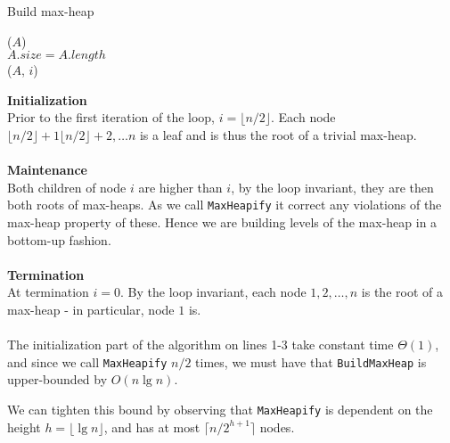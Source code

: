 
\begin{algorithm}[H]
	\caption{Build max-heap}
	\label{alg:build-max-heap}
	
	
	
	
	
	\BlankLine
	\BuildMaxHeap($A$) \\
	\Begin
	{
		$A.size = A.length$ \\
		{
			\MaxHeapify($A$, $i$)
		}
	}
\end{algorithm}
\noindent \textbf{Initialization} \\
Prior to the first iteration of the loop, $i = \lfloor n/2 \rfloor$. Each node
$\lfloor n/2 \rfloor + 1 \lfloor n/2 \rfloor + 2, \dots n$ is a leaf and is
thus the root of a trivial max-heap.
\\\\
\noindent \textbf{Maintenance} \\
Both children of node $i$ are higher than $i$, by the loop invariant, they are
then both roots of max-heaps. As we call \texttt{MaxHeapify} it correct any
violations of the max-heap property of these. Hence we are building levels of
the max-heap in a bottom-up fashion.
\\\\
\noindent \textbf{Termination} \\
At termination $i = 0$. By the loop invariant, each node $1, 2, \dots, n$ is
the root of a max-heap - in particular, node $1$ is.
\\\\
The initialization part of the algorithm on lines 1-3 take constant time
$\Theta(1)$, and since we call \texttt{MaxHeapify} $n/2$ times, we must have
that \texttt{BuildMaxHeap} is upper-bounded by $O(n \lg n)$.

We can tighten this bound by observing that \texttt{MaxHeapify} is dependent
on the height $h = \lfloor \lg n \rfloor$, and has at most $\lceil n/2^{h+1}
\rceil$ nodes.


